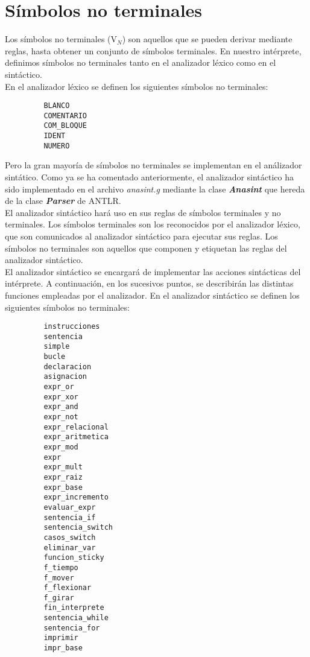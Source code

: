    \section{Símbolos no terminales}
   Los símbolos no terminales (V$_{N}$) son aquellos que se pueden derivar mediante reglas, hasta obtener un conjunto de símbolos terminales.
   En nuestro intérprete, definimos símbolos no terminales tanto en el analizador léxico como en el sintáctico.\\

   En el analizador léxico se definen los siguientes símbolos no terminales:\\
      \begin{lstlisting}
         BLANCO
         COMENTARIO
         COM_BLOQUE
         IDENT
         NUMERO
      \end{lstlisting}
   Pero la gran mayoría de símbolos no terminales se implementan en el análizador sintático. Como ya se ha comentado anteriormente, el analizador
   sintáctico ha sido implementado en el archivo \textit{anasint.g} mediante la clase \textbf{\textit{Anasint}} que hereda de la clase
   \textbf{\textit{Parser}} de ANTLR.\\

   El analizador sintáctico hará uso en sus reglas de símbolos terminales y no terminales. Los símbolos terminales son los reconocidos por el
   analizador léxico, que son comunicados al analizador sintáctico para ejecutar sus reglas. Los símbolos no terminales son aquellos que componen
   y etiquetan las reglas del analizador sintáctico.\\

   El analizador sintáctico se encargará de implementar las acciones sintácticas del intérprete. A continuación, en los sucesivos puntos, se
   describirán las distintas funciones empleadas por el analizador. En el analizador sintáctico se definen los siguientes símbolos no terminales:\\
      \begin{lstlisting}
         instrucciones
         sentencia
         simple
         bucle
         declaracion
         asignacion
         expr_or
         expr_xor
         expr_and
         expr_not
         expr_relacional
         expr_aritmetica
         expr_mod
         expr
         expr_mult
         expr_raiz
         expr_base
         expr_incremento
         evaluar_expr
         sentencia_if
         sentencia_switch
         casos_switch
         eliminar_var
         funcion_sticky
         f_tiempo
         f_mover
         f_flexionar
         f_girar
         fin_interprete
         sentencia_while
         sentencia_for
         imprimir
         impr_base
      \end{lstlisting}


